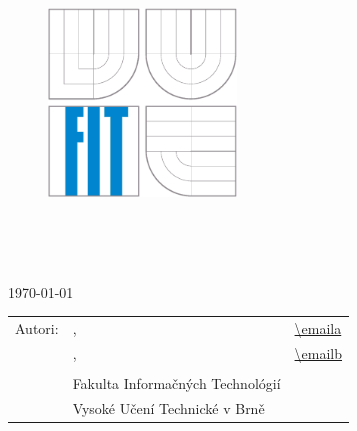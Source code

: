 \begin{titlepage}
	\begin{figure}[!h]
		\centering
		\includegraphics[height=5cm]{img/logo.eps}
	\end{figure}
	\vfill
	\begin{center}
		\begin{Large}
			\docname\\
		\end{Large}
		\bigskip
		\begin{Huge}
			\projname\\
		\end{Huge}
	\end{center}
	\vfill
	\begin{center}
		\begin{large}
			\today
		\end{large}
	\end{center}
	\vfill
	\begin{flushleft}
		\begin{large}
			\begin{tabular}{lll}
				Autori: & \authora, & \url{\emaila} \\
				        & \authorb, & \url{\emailb} \\
				& & \\
				& Fakulta Informačných Technológií \\
				& Vysoké Učení Technické v Brně \\
			\end{tabular}
		\end{large}
	\end{flushleft}
\end{titlepage}
